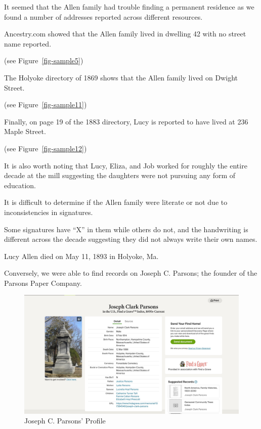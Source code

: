 \documentclass[
  letterpaper,
  DIV=11,
  numbers=noendperiod]{scrartcl}
\begin{document}
It seemed that the Allen family had trouble finding a permanent
residence as we found a number of addresses reported across different
resources.

Ancestry.com showed that the Allen family lived in dwelling 42 with no
street name reported.

(see Figure~\ref{fig-sample5})

The Holyoke directory of 1869 shows that the Allen family lived on
Dwight Street.

(see Figure~\ref{fig-sample11})

Finally, on page 19 of the 1883 directory, Lucy is reported to have
lived at 236 Maple Street.

(see Figure~\ref{fig-sample12})

It is also worth noting that Lucy, Eliza, and Job worked for roughly the
entire decade at the mill suggesting the daughters were not pursuing any
form of education.

It is difficult to determine if the Allen family were literate or not
due to inconsistencies in signatures.

Some signatures have ``X'' in them while others do not, and the
handwriting is different across the decade suggesting they did not
always write their own names.

Lucy Allen died on May 11, 1893 in Holyoke, Ma.

\newpage{}

Conversely, we were able to find records on Joseph C. Parsons; the
founder of the Parsons Paper Company.

\begin{figure}

{\centering \includegraphics[width=\textwidth,height=0.4\textheight]{Joseph_Clark.jpeg}

}

\caption{\label{fig-sample8}Joseph C. Parsons' Profile}

\end{figure}
\end{document}
